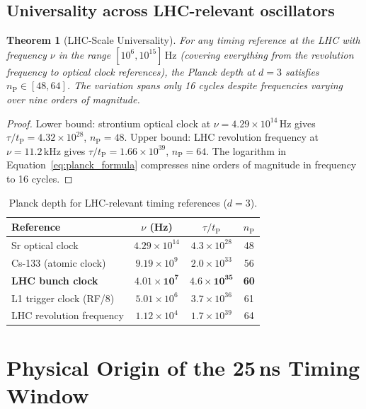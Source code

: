 \documentclass[twocolumn,10pt,a4paper]{article}
\theoremstyle{thmstyle}
\newtheorem{theorem}{Theorem}[section]
\theoremstyle{definition}
\theoremstyle{remark}
\newcommand{\tP}{t_{\mathrm{P}}}
\newcommand{\nP}{n_{\mathrm{P}}}
\begin{document}
\subsection{Universality across LHC-relevant oscillators}

\begin{theorem}[LHC-Scale Universality]
\label{thm:lhcuniversal}
For any timing reference at the LHC with frequency $\nu$ in the range
$[10^6, 10^{15}]\,\mathrm{Hz}$ (covering everything from the revolution
frequency to optical clock references), the Planck depth at $d = 3$
satisfies $\nP \in [48, 64]$. The variation spans only 16 cycles despite
frequencies varying over nine orders of magnitude.
\end{theorem}

\begin{proof}
Lower bound: strontium optical clock at $\nu = 4.29 \times 10^{14}\,\mathrm{Hz}$
gives $\tau/\tP = 4.32 \times 10^{28}$, $\nP = 48$.
Upper bound: LHC revolution frequency at $\nu = 11.2\,\mathrm{kHz}$
gives $\tau/\tP = 1.66 \times 10^{39}$, $\nP = 64$.
The logarithm in Equation~\eqref{eq:planck_formula} compresses nine orders
of magnitude in frequency to 16 cycles.
\end{proof}

\begin{table}[h]
\centering\small
\caption{Planck depth for LHC-relevant timing references ($d = 3$).}
\label{tab:lhc_planck}
\begin{tabular}{lccc}
\toprule
Reference & $\nu$ (Hz) & $\tau/\tP$ & $\nP$ \\
\midrule
Sr optical clock & $4.29 \times 10^{14}$ & $4.3 \times 10^{28}$ & 48 \\
Cs-133 (atomic clock) & $9.19 \times 10^{9}$ & $2.0 \times 10^{33}$ & 56 \\
\textbf{LHC bunch clock} & $\mathbf{4.01 \times 10^{7}}$ & $\mathbf{4.6 \times 10^{35}}$ & \textbf{60} \\
L1 trigger clock (RF/8) & $5.01 \times 10^{6}$ & $3.7 \times 10^{36}$ & 61 \\
LHC revolution frequency & $1.12 \times 10^{4}$ & $1.7 \times 10^{39}$ & 64 \\
\bottomrule
\end{tabular}
\end{table}

\section{Physical Origin of the 25\,ns Timing Window}
\label{sec:timing}
\end{document}
